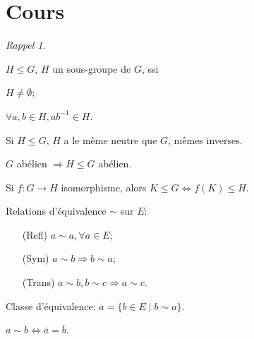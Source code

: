 \documentclass{report}
\newcounter{cours}
\newcommand*{\cours}{\section*{Cours \thecours}\stepcounter{cours}}
\theoremstyle{definition}
\theoremstyle{remark}
\newtheorem*{rappel}{Rappel}
\begin{document}
	\cours
	\begin{rappel}~

		\begin{ulist}[noitemsep]
			\item $H \leq G$, $H$ un sous-groupe de $G$, ssi
			\begin{ulist}
				\item $H \neq \emptyset$;
				\item $\forall a,b \in H, ab^{-1} \in H$.
			\end{ulist}
			\item Si $H \leq G$, $H$ a le m\^eme neutre que $G$, m\^emes inverses.
			\item $G$ ab\'elien $\Rightarrow H \leq G$ ab\'elien.
			\item Si $f:G \to H$ isomorphisme, alors $K \leq G \Leftrightarrow f(K) \leq H$.
			\item Relations d'\'equivalence $\sim$ sur $E$:
			\begin{itemize}
				\item[(Refl)] $a \sim a, \forall a \in E$;
				\item[(Sym)] $a \sim b \Rightarrow b \sim a$;
				\item[(Trans)] $a \sim b, b \sim c \Rightarrow a \sim c$.
			\end{itemize}
			\item Classe d'\'equivalence: $\overline{a} = \{b \in E \mid b \sim a\}$.
			\item $a \sim b \Longleftrightarrow \overline{a} = \overline{b}$.
		\end{ulist}
	\end{rappel}
\end{document}
